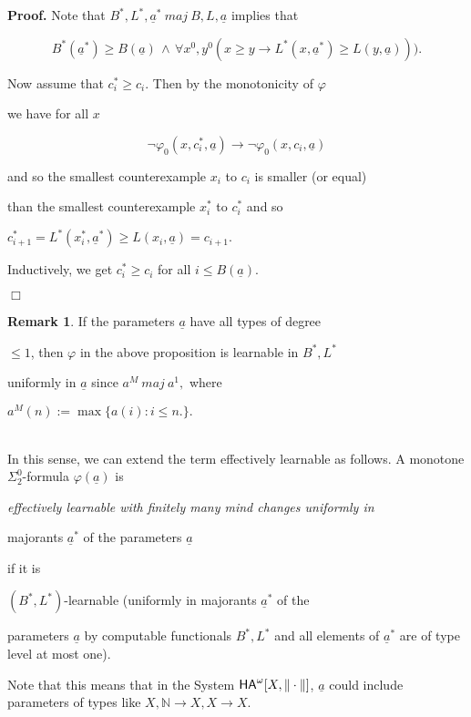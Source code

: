 \documentclass[1p]{elsarticle}
\newcommand{\usftext}[1]{\textsf{\upshape #1}}
\newcommand{\NN}{\ensuremath{\mathbb{N}}}
\newcommand{\ha}{\ensuremath{{\usftext{HA}}^\omega}} %
\newcommand{\tup}{\underline} %
\theoremstyle{plain}
\theoremstyle{definition}
\newtheorem{rmk}[thm]{Remark}
\theoremstyle{remark}
\renewcommand{\phi}{\varphi}
\theoremstyle{definition}
\begin{document}
{\bf Proof.} Note that $B^*,L^*,\tup a^* \ maj \ B,L,\tup a$ implies that 

\[ B^*(\underline{a}^*) \ge B(\underline{a}) \,\wedge\,\forall x^0,y^0 

(x\ge y\to L^*(x,\underline{a}^*)\ge L(y,\underline{a}))).\] 

Now assume that $c^*_i\ge c_i.$ Then by the monotonicity of $\varphi$ 

we have for all $x$ 

\[ \neg \varphi_0(x,c^*_i,\underline{a})\rightarrow \neg \varphi_0

(x,c_i,\underline{a}) \] 

and so the smallest counterexample $x_i$ to $c_i$ is smaller (or equal) 

than the smallest counterexample $x^*_i$ to $c^*_i$ and so 

$c^*_{i+1}=L^*(x^*_i,\underline{a}^*) \ge L(x_i,\underline{a})=c_{i+1}.$ 

Inductively, we get $c^*_i\ge c_i$ for all $i\le B(\underline{a}).$ 

\hfill $\Box$  





\begin{rmk} If the parameters $\underline{a}$ have all types of degree 

$\le 1$, then $\varphi$ in the above proposition is learnable in $B^*,L^*$ 

uniformly in $\underline{a}$ since $a^M \ maj \ a^1,$ where 

$a^M(n):=\max\{ a(i):i\le n.\}.$

\\ In this sense, we can extend the term effectively learnable as follows. A monotone $\Sigma^0_2$-formula $\phi(\tup a)$ is 

{\em effectively learnable with finitely many mind changes uniformly in 

majorants $\underline{a}^*$ of the parameters $\underline{a}$} if it is 

$(B^*,L^*)$-learnable (uniformly in majorants $\underline{a}^*$ of the 

parameters $\underline{a}$ by computable functionals $B^*,L^*$ and all elements of $\tup a^*$ are of type level at most one). 

Note that this means that in the System $\ha[X,\|\cdot\|]$, $\tup a$ could include parameters of types like $X,\NN\to X,X\to X$.

\end{rmk}
\end{document}
